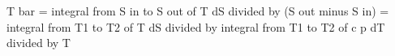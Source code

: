 T bar = integral from S in to S out of T dS divided by (S out minus S in) = integral from T1 to T2 of T dS divided by integral from T1 to T2 of c p dT divided by T